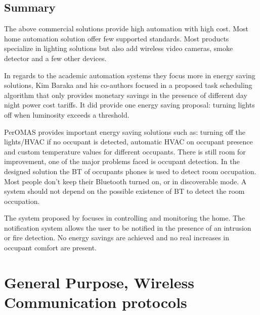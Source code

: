 \subsection{Summary}

The above commercial solutions provide high automation with high cost. Most home automation solution offer few supported standards. Most products specialize in lighting solutions but also add wireless video cameras, smoke detector and a few other devices. 


In regards to the academic automation systems they focus more in energy saving  solutions, Kim Baraka and his co-authors\cite{academic:arduino1} focused in a proposed task scheduling algorithm that only provides monetary savings in the presence of different day night power cost tariffs. It did provide one energy saving proposal: turning lights off when luminosity exceeds a threshold.

PerOMAS\cite{peromas} provides important energy saving solutions such as: turning off the lights/\ac{HVAC} if no occupant is detected, automatic HVAC on occupant presence and custom temperature values for different occupants. There is still room for improvement, one of the major problems faced is occupant detection. In the designed solution the \ac{BT} of occupants phones is used to detect room occupation. Most people don't keep their Bluetooth turned on, or in discoverable mode. A system should not depend on the possible existence of \ac{BT} to detect the room occupation. 

The system proposed by \cite{academic3} focuses in controlling and monitoring the home. The notification system allows the user to be notified in the presence of an intrusion or fire detection.
No energy savings are achieved and no real increases in occupant comfort are present.



\section{General Purpose, Wireless Communication protocols} \label{ssec:num2}

